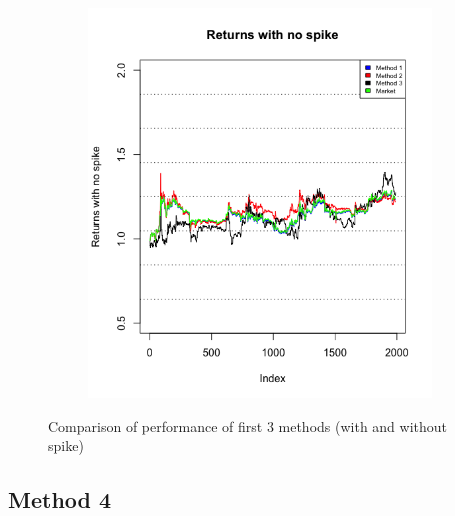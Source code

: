 \documentclass[a4paper,12pt]{article}
\begin{document}
\begin{figure}[h!]
\begin{subfigure}[b]{0.4\linewidth}
    \includegraphics[width=\linewidth]{figures/returns_no_spike.png}
  \end{subfigure}
  \caption{Comparison of performance of first 3 methods (with and without spike)}
  \label{fig:comparison}
\end{figure}

\subsection{Method 4}
\end{document}
